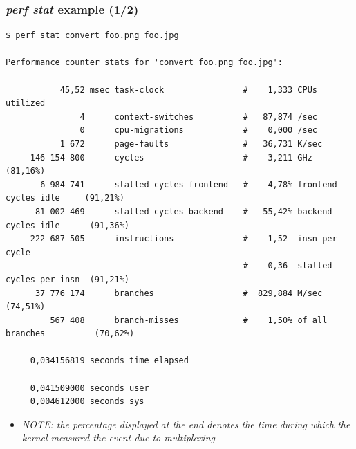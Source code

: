 \begin{frame}[fragile]
  \frametitle{{\em perf stat} example (1/2)}
  \begin{block}{}
    \begin{verbatim}
$ perf stat convert foo.png foo.jpg

Performance counter stats for 'convert foo.png foo.jpg':

           45,52 msec task-clock                #    1,333 CPUs utilized          
               4      context-switches          #   87,874 /sec                   
               0      cpu-migrations            #    0,000 /sec                   
           1 672      page-faults               #   36,731 K/sec                  
     146 154 800      cycles                    #    3,211 GHz                      (81,16%)
       6 984 741      stalled-cycles-frontend   #    4,78% frontend cycles idle     (91,21%)
      81 002 469      stalled-cycles-backend    #   55,42% backend cycles idle      (91,36%)
     222 687 505      instructions              #    1,52  insn per cycle         
                                                #    0,36  stalled cycles per insn  (91,21%)
      37 776 174      branches                  #  829,884 M/sec                    (74,51%)
         567 408      branch-misses             #    1,50% of all branches          (70,62%)

     0,034156819 seconds time elapsed

     0,041509000 seconds user
     0,004612000 seconds sys
    \end{verbatim}
  \end{block}
  \begin{itemize}
    \item {\em NOTE: the percentage displayed at the end denotes the time
          during which the kernel measured the event due to multiplexing}
  \end{itemize}
\end{frame}

